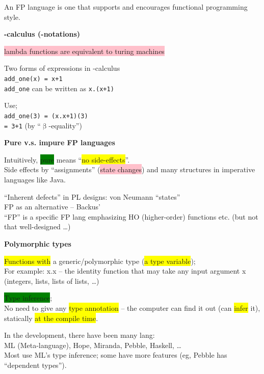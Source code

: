 \documentclass[tikz,border=10pt]{project_plan}
\begin{document}
An FP language is one that supports and encourages functional programming style.

\textbf{\textlambda -calculus (\textlambda -notations)}

\colorbox{pink}{lambda functions are equivalent to turing machines}

Two forms of expressions in \textlambda -calculus\\
\lstinline[columns=fixed]{add_one(x) = x+1}\\
\lstinline[columns=fixed]{add_one} can be written as \textlambda\lstinline[columns=fixed]{x.(x+1)}

Use;\\
\lstinline[columns=fixed]{add_one(3) = (}\textlambda\lstinline[columns=fixed]{x.x+1)(3)}\\
\hphantom{~~~~~~~~~~~~~~~~~~~~~}\lstinline[columns=fixed]{= 3+1} (by “$\upbeta$-equality”)

\textbf{Pure v.s. impure FP languages}

Intuitively, \colorbox{green}{pure} means “\colorbox{yellow}{no side-effects}”.\\
Side effects by “assignments” (\colorbox{pink}{state changes}) and many structures in imperative languages like Java.

“Inherent defects” in PL designs: von Neumann “states”\\
FP as an alternative – Backus’ \\
“FP” is a specific FP lang emphasizing HO (higher-order) functions etc. (but not that well-designed …)

\textbf{Polymorphic types}

\colorbox{yellow}{Functions with} a generic/polymorphic type (\colorbox{yellow}{a type variable});\\
For example: \textlambda x.x – the identity function that may take any input argument x (integers, lists, lists of lists, …)

\colorbox{green}{Type inference};\\
No need to give any \colorbox{yellow}{type annotation} – the computer can find it out (can \colorbox{yellow}{infer} it), statically \colorbox{yellow}{at the compile time}.

In the development, there have been many lang:\\
ML (Meta-language), Hope, Miranda, Pebble, Haskell, …\\
Most use ML’s type inference; some have more features (eg, Pebble has “dependent types”).
\end{document}
